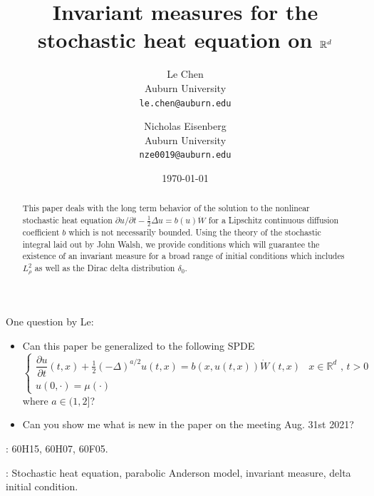 \documentclass[a4paper,11pt]{article}%
\title{Invariant measures for the stochastic heat equation on $\R^d$}
\author{Le Chen\\Auburn University\\\texttt{le.chen@auburn.edu}\\
	\and
		Nicholas Eisenberg\\Auburn University\\\texttt{nze0019@auburn.edu}
	}
\date{\today}
\numberwithin{equation}{section}
\theoremstyle{plain}
\theoremstyle{definition}
\newcommand{\R}{\mathbb{R}}
\begin{document}
\maketitle


One question by Le:
\begin{itemize}
	\item Can this paper be generalized to the following SPDE
	\begin{equation}
		\label{E:FSHE}
		\begin{cases}
			\dfrac{\partial u}{\partial t}(t,x)+\frac{1}{2}(-\Delta)^{a/2} u(t,x) = b(x,u(t,x))\dot W(t,x) & \text{$x\in \R^d$ , $t>0$} \\
		u(0,\cdot) = \mu(\cdot)                                                                          &
		\end{cases}
	\end{equation}
	where $a\in (1,2]$?
	\item Can you show me what is new in the paper on the meeting Aug. 31st 2021?
\end{itemize}
\newpage

\begin{abstract}
	This paper deals with the long term behavior of the solution to the nonlinear stochastic heat equation
	$\partial u /\partial t - \frac{1}{2}\Delta u= b(u)\dot{W}$ for a Lipschitz continuous diffusion coefficient
	$b$ which is not necessarily bounded. Using the theory of the stochastic integral laid out by John Walsh,
	we provide conditions which will guarantee the existence of an invariant measure for a broad range of initial
	conditions which includes $L^2_\rho$ as well as the Dirac delta distribution $\delta_0$.
\end{abstract}

\bigskip

: 60H15, 60H07, 60F05.
 \smallskip

: Stochastic heat equation, parabolic Anderson model, invariant measure, delta initial condition.
\smallskip

\end{document}
